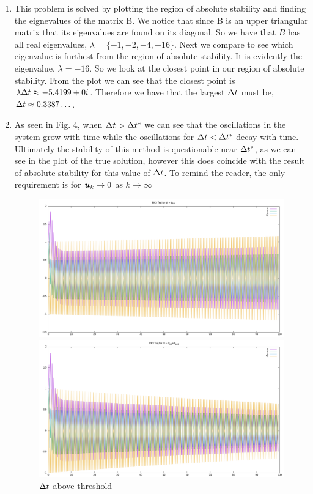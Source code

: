\documentclass{article}
\begin{document}
\begin{enumerate}[label=\alph*)]
    \item  
    This problem is solved by plotting the region of absolute stability and
    finding the eignevalues of the matrix B. We notice that since B is an upper
    triangular matrix that its eigenvalues are found on its diagonal. So we have
    that $B$ has all real eigenvalues, $\lambda = \{-1, -2, -4, -16\}$. Next we
    compare to see which eigenvalue is furthest from the region of absolute
    stability. It is evidently the eigenvalue, $\lambda = -16$. So we look at
    the closest point in our region of absolute stability. From the plot we can
    see that the closest point is $\lambda\Delta t \approx -5.4199 + 0i$. Therefore we
    have that the largest $\Delta t$ must be, $\Delta t \approx 0.3387\ldots$. 

    \item As seen in Fig. 4, when $\Delta t > \Delta t^*$ we can see that the oscillations
    in the system grow with time while the oscillations for $\Delta t < \Delta t^*$ decay
    with time. Ultimately the stability of this method is questionable near
    $\Delta t^*$, as we can see in the plot of the true solution, however this does
    coincide with the result of absolute stability for this value of $\Delta t$. To
    remind the reader, the only requirement is for $\boldsymbol{u}_k \to 0$ as $k \to
    \infty$
    \begin{figure}[ht]
        \centering 
        \begin{minipage}{0.48\textwidth}
            \centering
            \includegraphics[width=1\textwidth]{rk3_fail.png}
            \caption*{$\Delta t$ above threshold}
        \end{minipage}
        \begin{minipage}{0.48\textwidth}
            \centering
            \includegraphics[width=1\textwidth]{rk3_pass.png}

\end{minipage}
\end{figure}
\end{enumerate}
\end{document}
